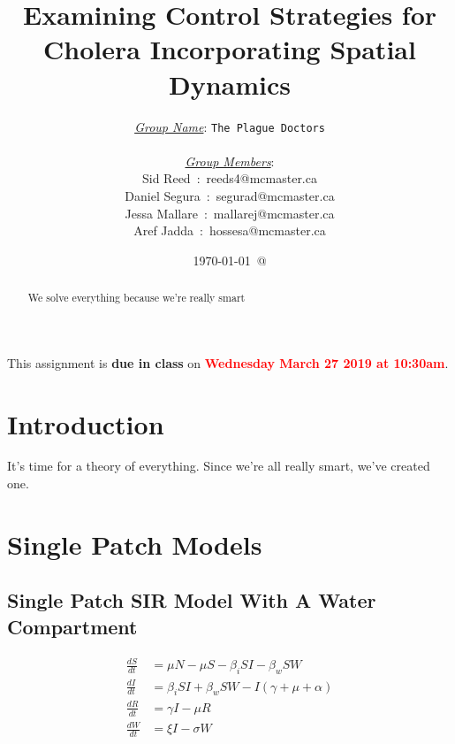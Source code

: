 \documentclass[12pt]{article}\usepackage[]{graphicx}\usepackage[]{color}
\begin{document}
\title{Examining Control Strategies for Cholera Incorporating Spatial Dynamics}
\author{
\underline{\emph{Group Name}}: \texttt{{\color{blue}The Plague Doctors}}\\\\
\underline{\emph{Group Members}}:\\
         Sid Reed\ :\ {\color{blue}reeds4@mcmaster.ca}\\
         Daniel Segura\ :\ {\color{blue}segurad@mcmaster.ca}\\
         Jessa Mallare\ :\ {\color{blue}mallarej@mcmaster.ca}\\
         Aref Jadda\ :\ {\color{blue}hossesa@mcmaster.ca}\\
}
\date{\today\ @ \thistime}
\maketitle
\bigskip
\noindent
This assignment is {\bfseries\color{red} due in class} on \textcolor{red}{\bf Wednesday March 27 2019 at 10:30am}.
\bigskip

\linenumbers

\begin{abstract}
We solve everything because we're really smart
\end{abstract}

\clearpage
\tableofcontents
\clearpage

\section{Introduction}

It's time for a theory of everything.  Since we're all really smart, we've created one.

\section{Single Patch Models}
\subsection{Single Patch SIR Model With A Water Compartment}

\begin{linenomath}
	\begin{align*}
		\frac{dS}{dt}&= \mu N - \mu S - \beta_i SI - \beta_w S W  \\
		\frac{dI}{dt}&= \beta_i S I + \beta_w S W - I (\gamma + \mu + \alpha) \\
		\frac{dR}{dt}&= \gamma I - \mu R \\
		\frac{dW}{dt}&= \xi I  - \sigma W
	\end{align*}
\end{linenomath}
\end{document}
